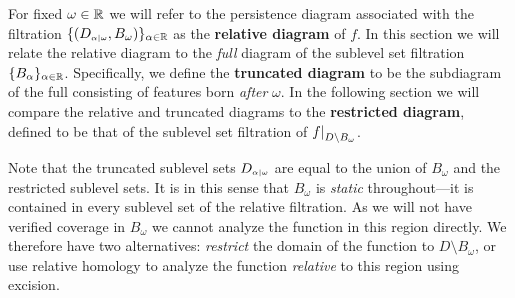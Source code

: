 

For fixed $\omega\in\mathbb{R}$ we will refer to the persistence diagram associated with the filtration $\{(D_{\scriptscriptstyle \alpha\mid \omega}, B_\omega)\}_{\alpha\in\mathbb{R}}$  as the \textbf{relative diagram} of $f$.
In this section we will relate the relative diagram to the \emph{full} diagram of the sublevel set filtration $\{B_\alpha\}_{\alpha\in\mathbb{R}}$.
Specifically, we define the \textbf{truncated diagram} to be the subdiagram of the full consisting of features born \emph{after} $\omega$.
In the following section we will compare the relative and truncated diagrams to the \textbf{restricted diagram}, defined to be that of the sublevel set filtration of $f\mathord{\mid}_{D\setminus B_\omega}$.%

Note that the truncated sublevel sets $D_{\scriptscriptstyle \alpha\mid \omega}$ are equal to the union of $B_\omega$ and the restricted sublevel sets.
It is in this sense that $B_\omega$ is \emph{static} throughout---it is contained in every sublevel set of the relative filtration.
As we will not have verified coverage in $B_\omega$ we cannot analyze the function in this region directly.
We therefore have two alternatives: \emph{restrict} the domain of the function to $D\setminus B_\omega$, or use relative homology to analyze the function \emph{relative} to this region using excision.

